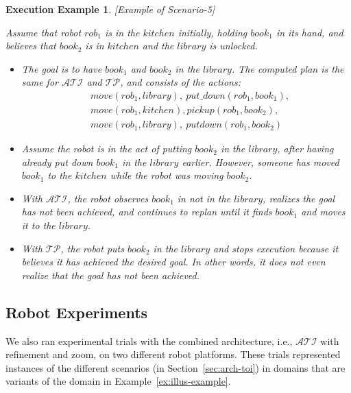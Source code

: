 \documentclass[letterpaper, 10 pt, conference]{article}  %
\newtheorem{execexample}{\bf Execution Example}
\begin{document}
\begin{execexample}\label{exec:example2}[Example of Scenario-5]\\
  {\rm Assume that robot $rob_1$ is in the $kitchen$ initially,
    holding $book_1$ in its hand, and believes that $book_2$ is in
    $kitchen$ and the $library$ is unlocked.
    \begin{itemize}
    \item The goal is to have $book_1$ and $book_2$ in the $library$.
      The computed plan is the same for $\mathcal{ATI}$ and
      $\mathcal{TP}$, and consists of the actions:
      \begin{align*}
        &move(rob_1, library),~put\_down(rob_1, book_1),\\
        &move(rob_1, kitchen), pickup(rob_1, book_2),\\
        &move(rob_1, library), ~putdown(rob_1, book_2)
      \end{align*}
    
    \item Assume the robot is in the act of putting $book_2$ in the
      $library$, after having already put down $book_1$ in the
      $library$ earlier. However, someone has moved $book_1$ to
      the $kitchen$ while the robot was moving $book_2$.

    \item With $\mathcal{ATI}$, the robot observes $book_1$ in not in
      the $library$, realizes the goal has not been achieved, and
      continues to replan until it finds $book_1$ and moves it to the
      $library$.

    \item With $\mathcal{TP}$, the robot puts $book_2$ in the
      $library$ and stops execution because it believes it has
      achieved the desired goal. In other words, it does not even
      realize that the goal has not been achieved.
    \end{itemize}
  }
\end{execexample}


\subsection{Robot Experiments}
\label{sec:expres-robots}
We also ran experimental trials with the combined architecture, i.e.,
$\mathcal{ATI}$ with refinement and zoom, on two different robot
platforms. These trials represented instances of the different
scenarios (in Section~\ref{sec:arch-toi}) in domains that are variants
of the domain in Example~\ref{ex:illus-example}.
\end{document}

